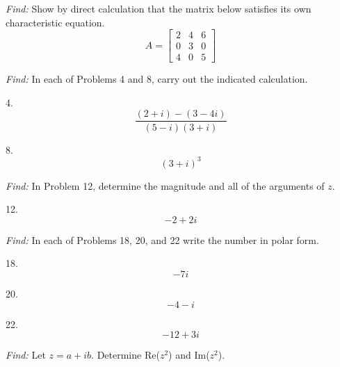 \documentclass[11pt]{homework}
\begin{document}
\question
\emph{Find:}
\newline
Show by direct calculation that the matrix below 
satisfies its own characteristic equation.
\begin{equation*}
A = 
  \begin{bmatrix}
  2 & 4 & 6 \\
  0 & 3 & 0 \\
  4 & 0 & 5
  \end{bmatrix}
\end{equation*}

\emph{Find:}
\newline
In each of Problems 4 and 8, 
carry out the indicated calculation.

4. 
\begin{equation*}
  \frac{(2+i)-(3-4i)}{(5-i)(3+i)}
\end{equation*}

8. 
\begin{equation*}
(3+i)^3
\end{equation*}


\emph{Find:}
\newline
In Problem 12, determine the magnitude and all of the arguments 
of $z$.

12.
\begin{equation*}
  -2+2i
\end{equation*}


\emph{Find:}
\newline
In each of Problems 18, 20, and 22
write the number in polar form.

18.
\begin{equation*}
-7i
\end{equation*}

20. 
\begin{equation*}
  -4 -i
\end{equation*}

22.
\begin{equation*}
  -12 +3i
\end{equation*}

\emph{Find:}
\newline
Let $z=a+ib$. 
Determine Re($z^2$) and Im($z^2$).
\end{document}
